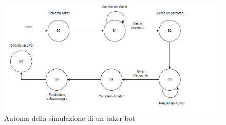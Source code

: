 \documentclass[main.tex]{subfiles}
\begin{document}
\begin{figure}[H]
    \centering
    \includegraphics[width=1.2\linewidth]{img/simulazione/takerbot/taker-simulazione.png}
    \caption{Automa della simulazione di un taker bot}
    \label{fig:takerbot automa}
\end{figure}
\end{document}
